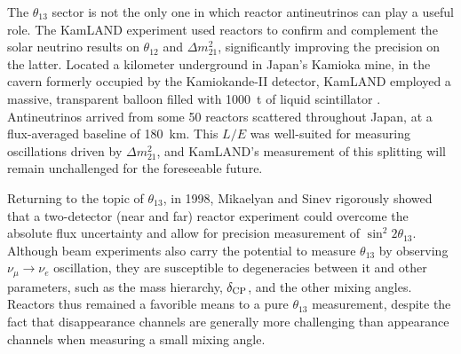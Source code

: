 \documentclass[../thesis.tex]{subfiles}
\begin{document}
The $\theta_{13}$ sector is not the only one in which reactor antineutrinos can play a useful role. The KamLAND experiment used reactors to confirm and complement the solar neutrino results on $\theta_{12}$ and $\Delta m^2_{21}$, significantly improving the precision on the latter. Located a kilometer underground in Japan's Kamioka mine, in the cavern formerly occupied by the Kamiokande-II detector, KamLAND employed a massive, transparent balloon filled with 1000~t of liquid scintillator \cite{PhysRevLett.90.021802}. Antineutrinos arrived from some 50 reactors scattered throughout Japan, at a flux-averaged baseline of 180~km. This $L/E$ was well-suited for measuring oscillations driven by $\Delta m^2_{21}$, and KamLAND's measurement of this splitting will remain unchallenged for the foreseeable future.

Returning to the topic of $\theta_{13}$, in 1998, Mikaelyan and Sinev \cite{Mikaelyan:1998yg} rigorously showed that a two-detector (near and far) reactor experiment could overcome the absolute flux uncertainty and allow for precision measurement of $\sin^2 2\theta_{13}$. Although beam experiments also carry the potential to measure $\theta_{13}$ by observing $\nu_\mu \to \nu_e$ oscillation, they are susceptible to degeneracies between it and other parameters, such as the mass hierarchy, $\delta_\text{CP}$, and the other mixing angles. Reactors thus remained a favorible means to a pure $\theta_{13}$ measurement, despite the fact that disappearance channels are generally more challenging than appearance channels when measuring a small mixing angle.
\end{document}
